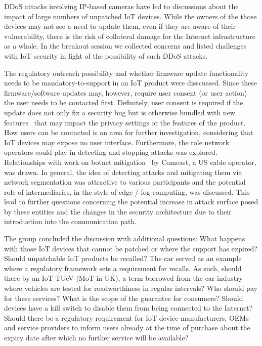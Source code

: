 \ac{DDoS} attacks involving IP-based cameras have led to discussions about the
impact of large numbers of unpatched \ac{IoT} devices. While the owners of the
those devices may not see a need to update them, even if they are aware of
their vulnerability, there is the risk of collateral damage for the Internet
infrastructure as a whole. In the breakout session we collected concerns and
listed challenges with IoT security in light of the possibility of such
\ac{DDoS} attacks.

The regulatory outreach possibility and whether firmware update functionality
needs to be mandatory-to-support in an IoT product were disscussed. Since
these firmware/software updates may, however, require user consent (or user
action) the user needs to be contacted first. Definitely, user consent is
required if the update does not only fix a security bug but is otherwise
bundled with new features~\cite{philips, hp} that may impact the privacy
settings or the features of the product. How users can be contacted is an area
for further investigation, considering that \ac{IoT} devices may expose no
user interface.  Furthermore, the role network operators could play in
detecting and stopping attacks was explored. Relationships with work on botnet
mitigation~\cite{rfc6561, rfc6108} by Comcast, a US cable operator, was drawn.
In general, the idea of detecting attacks and mitigating them via network
segmentation was attractive to various participants and the potential role of
intermediaries, in the style of edge / fog computing, was discussed.  This
lead to further questions concerning the potential increase in attack surface
posed by these entities and the changes in the security architecture due to
their introduction into the communication path.

The group concluded the discussion with additional questions: What happens
with those \ac{IoT} devices that cannot be patched or where the support has
expired? Should unpatchable \ac{IoT} products be recalled? The car served as
an example where a regulatory framework sets a requirement for recalls. As
such, should there by an \ac{IoT} TUeV (MoT in UK), a term borrowed from the
car industry where vehicles are tested for roadworthiness in regular
intervals?  Who should pay for these services? What is the scope of the
guarantee for consumers?  Should devices have a kill switch to disable them
from being connected to the Internet? Should there be a regulatory requirement
for \ac{IoT} device manufacturers, OEMs and service providers to inform users
already at the time of purchase about the expiry date after which no further
service will be available?


